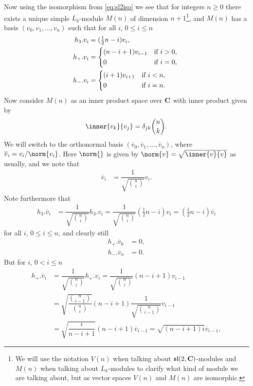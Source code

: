 Now using the isomorphism from \cref{eq:sl2iso} we see that for integers $n\geq 0$ there exists a unique simple $L_k$-module $M(n)$ of dimension $n+1$\footnote{We will use the notation $V(n)$ when talking about $\mathfrak{sl}(2,\mathbf{C})$-modules and $M(n)$ when talking about $L_k$-modules to clarify what kind of module we are talking about, but as vector spaces $V(n)$ and $M(n)$ are isomorphic.}, and $M(n)$ has a basis $(v_0,v_1,\dotsc,v_n)$ such that for all $i$, $0\leq i\leq n$
\begin{align}\label{eq:L_kbasis1}
  \begin{aligned}
    h_3.v_i &= (\tfrac{1}{2}n-i)v_i, \\
    h_+.v_i &=
    \begin{dcases*}
      (n-i+1)v_{i-1} & if $i>0$, \\
      0 & if $i=0$,
    \end{dcases*} \\
    h_-.v_i &=
    \begin{dcases*}
      (i+1)v_{i+1} & if $i<n$, \\
      0 & if $i=n$.
    \end{dcases*}
  \end{aligned}
\end{align}
Now consider $M(n)$ as an inner product space over $\mathbf{C}$ with inner product given by
\begin{align}\label{inprodstart}
  \inner{v_k}{v_j} = \delta_{jk}\binom{n}{k}.
\end{align}
We will switch to the orthonormal basis $(\overline v_0,\overline v_1,\dotsc,\overline v_n)$, where $\overline v_i = v_i/\norm{v_i}$. Here $\norm{}$ is given by $\norm{v}=\sqrt{\inner{v}{v}}$ as usually, and we note that
\begin{align*}
  \overline v_i &= \dfrac{1}{\sqrt{\binom{n}{i}}}v_i.
\end{align*}
Note furthermore that
\begin{align*}
  h_3.\overline v_i &= \dfrac{1}{\sqrt{\binom{n}{i}}}h_3.v_i = \dfrac{1}{\sqrt{\binom{n}{i}}}(\tfrac{1}{2}n-i)v_i = (\tfrac{1}{2}n-i)\overline v_i
\end{align*}
for all $i$, $0\leq i\leq n$, and clearly still
\begin{align*}
  h_+.\overline v_0 &= 0, \\
  h_-.\overline v_n &= 0.
\end{align*}
But for $i$, $0<i\leq n$
\begin{align*}
  h_+.\overline v_i &= \dfrac{1}{\sqrt{\binom{n}{i}}}h_+.v_i = \dfrac{1}{\sqrt{\binom{n}{i}}}(n-i+1)v_{i-1} \\
         &= \sqrt{\dfrac{\binom{n}{i-1}}{\binom{n}{i}}}(n-i+1)\dfrac{1}{\sqrt{\binom{n}{i-1}}}v_{i-1} \\  
  &= \sqrt{\dfrac{i}{n-i+1}}(n-i+1)\overline v_{i-1} = \sqrt{(n-i+1)i}\overline v_{i-1},
\end{align*}
